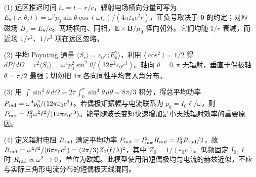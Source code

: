 (1) 远区推迟时间 \(t_r=t-r/c\)，辐射电场横向分量可写为 \(E_\theta(r,\theta,t)=\omega^2p_0\sin\theta\cos(\omega t_r)/(4\pi\varepsilon_0c^2r)\)，正负号取决于 \(\hat{\boldsymbol\theta}\) 的约定；对应磁场 \(B_\phi=E_\theta/c\)。两场横向、同相，\(\boldsymbol E\times\boldsymbol B/\mu_0\) 径向朝外。它们均随 \(1/r\) 衰减，而近场 \(1/r^2\)、\(1/r^3\) 项在远区忽略。

(2) 平均 Poynting 通量 \(\langle S_r\rangle=\varepsilon_0c\langle E_\theta^2\rangle\)，利用 \(\langle\cos^2\rangle=1/2\) 得 \(dP/d\Omega=r^2\langle S_r\rangle=\omega^4p_0^2\sin^2\theta/(32\pi^2\varepsilon_0c^3)\)。轴向 \(\theta=0,\pi\) 无辐射，垂直于偶极轴 \(\theta=\pi/2\) 最强；切勿把 \(4\pi\) 各向同性平均套入角分布。

(3) 用 \(\int\sin^2\theta\,d\Omega=2\pi\int_0^\pi\sin^3\theta\,d\theta=8\pi/3\) 积分，得总平均功率 \(P_{\rm rad}=\omega^4p_0^2/(12\pi\varepsilon_0c^3)\)。若偶极矩振幅与电流联系为 \(p_0=I_0\ell/\omega\)，则 \(P_{\rm rad}=I_0^2\omega^2\ell^2/(12\pi\varepsilon_0c^3)\)。能量随波长变短快速增加是小天线辐射效率的重要原因。

(4) 定义辐射电阻 \(R_{\rm rad}\) 满足平均功率 \(P_{\rm rad}=I_{\rm rms}^2R_{\rm rad}=I_0^2R_{\rm rad}/2\)，故 \(R_{\rm rad}=\omega^2\ell^2/(6\pi\varepsilon_0c^3)=(2\pi/3)Z_0(\ell/\lambda)^2\)，其中 \(Z_0=1/(\varepsilon_0c)\)。低频固定 \(I_0,\ell\) 时 \(R_{\rm rad}\propto\omega^2\to0\)，单位为欧姆。此模型使用沿短偶极均匀电流的赫兹近似，不应与实际三角形电流分布的短偶极天线混同。
